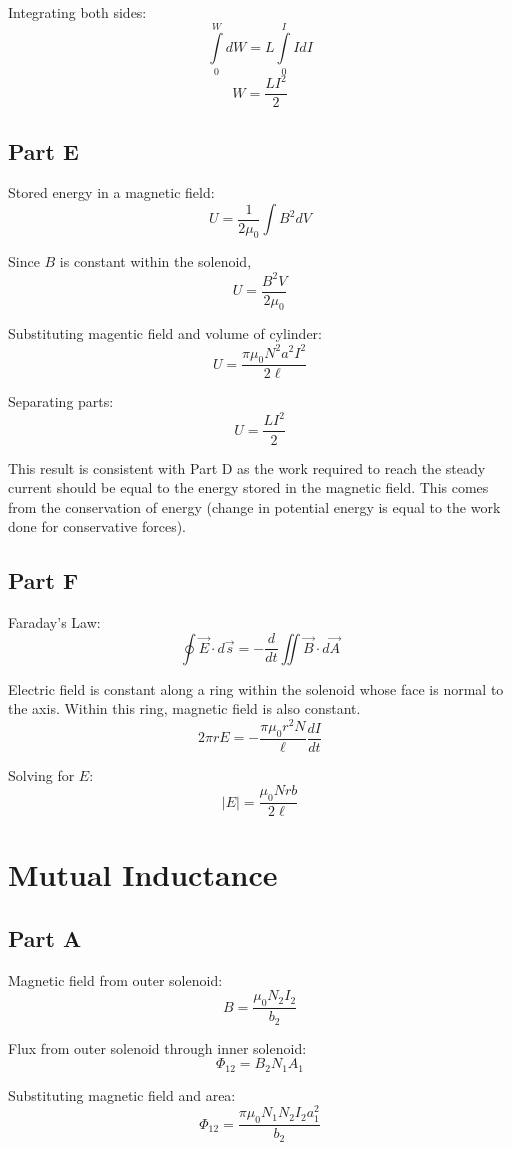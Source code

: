 \documentclass{article}
\begin{document}
Integrating both sides:
$$ \int\limits_0^W dW = L \int\limits_0^I I dI $$
$$ W = \frac{L I^2}{2} $$

\subsection*{Part E}

Stored energy in a magnetic field:
$$ U = \frac{1}{2 \mu_0} \int B^2 dV $$

Since $B$ is constant within the solenoid,
$$ U = \frac{B^2 V}{2 \mu_0} $$

Substituting magentic field and volume of cylinder:
$$ U = \frac{\pi \mu_0 N^2 a^2 I^2}{2 \ell} $$

Separating parts:
$$ U = \frac{LI^2}{2} $$

This result is consistent with Part D as the work required to reach the steady
current should be equal to the energy stored in the magnetic field. This comes
from the conservation of energy (change in potential energy is equal to the work
done for conservative forces).

\subsection*{Part F}

Faraday's Law:
$$ \oint \vec{E} \cdot d\vec{s} = -\frac{d}{dt}\iint \vec{B} \cdot d\vec{A} $$

Electric field is constant along a ring within the solenoid whose face is normal
to the axis. Within this ring, magnetic field is also constant.
$$ 2 \pi r E = -\frac{\pi \mu_0 r^2 N}{\ell} \frac{dI}{dt} $$

Solving for $E$:
$$ \vert E \vert = \frac{\mu_0 N r b}{2 \ell} $$

\section{Mutual Inductance}

\subsection*{Part A}

Magnetic field from outer solenoid:
$$ B = \frac{\mu_0 N_2 I_2}{b_2} $$

Flux from outer solenoid through inner solenoid:
$$ \Phi_{12} = B_2 N_1 A_1 $$

Substituting magnetic field and area:
$$ \Phi_{12} = \frac{\pi \mu_0 N_1 N_2 I_2 a_1^2}{b_2} $$
\end{document}
